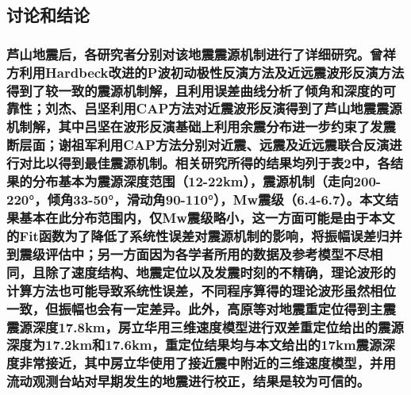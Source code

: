 \documentclass[a4paper,12pt,single,pdftex]{scrartcl}
\begin{document}
\label{ID_77282899}\subsection{讨论和结论}

\label{ID_1559489052}\subsubsection{芦山地震后，各研究者分别对该地震震源机制进行了详细研究。曾祥方\cite{曾祥方2013}利用Hardbeck\cite{Hardebeck2002}改进的P波初动极性反演方法及近远震波形反演方法得到了较一致的震源机制解，且利用误差曲线分析了倾角和深度的可靠性；刘杰\cite{刘杰2013}、吕坚\cite{吕坚2013}利用CAP方法对近震波形反演得到了芦山地震震源机制解，其中吕坚在波形反演基础上利用余震分布进一步约束了发震断层面；谢祖军\cite{谢祖军2013}利用CAP方法分别对近震、远震及近远震联合反演进行对比以得到最佳震源机制。相关研究所得的结果均列于表2中，各结果的分布基本为震源深度范围（12-22km），震源机制（走向200-220°，倾角33-50°，滑动角90-110°），Mw震级（6.4-6.7）。本文结果基本在此分布范围内，仅Mw震级略小，这一方面可能是由于本文的Fit函数为了降低了系统性误差对震源机制的影响，将振幅误差归并到震级评估中；另一方面因为各学者所用的数据及参考模型不尽相同，且除了速度结构、地震定位以及发震时刻的不精确，理论波形的计算方法也可能导致系统性误差，不同程序算得的理论波形虽然相位一致，但振幅也会有一定差异\cite{Herrmann1985}。此外，高原等\cite{高原2013}对地震重定位得到主震震源深度17.8km，房立华\cite{房立华2013}用三维速度模型进行双差重定位给出的震源深度为17.2km和17.6km，重定位结果均与本文给出的17km震源深度非常接近，其中房立华使用了接近震中附近的三维速度模型，并用流动观测台站对早期发生的地震进行校正，结果是较为可信的。}
\end{document}
